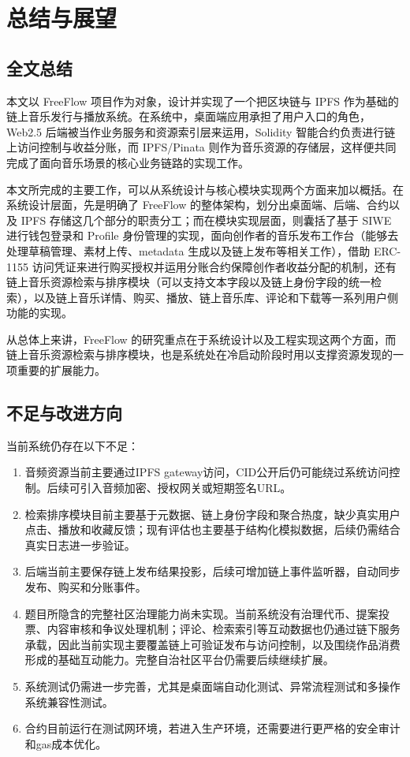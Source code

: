 
\chapter{总结与展望}


\section{全文总结}

本文以 FreeFlow 项目作为对象，设计并实现了一个把区块链与 IPFS 作为基础的链上音乐发行与播放系统。在系统中，桌面端应用承担了用户入口的角色，Web2.5 后端被当作业务服务和资源索引层来运用，Solidity 智能合约负责进行链上访问控制与收益分账，而 IPFS/Pinata 则作为音乐资源的存储层，这样便共同完成了面向音乐场景的核心业务链路的实现工作。

本文所完成的主要工作，可以从系统设计与核心模块实现两个方面来加以概括。在系统设计层面，先是明确了 FreeFlow 的整体架构，划分出桌面端、后端、合约以及 IPFS 存储这几个部分的职责分工；而在模块实现层面，则囊括了基于 SIWE 进行钱包登录和 Profile 身份管理的实现，面向创作者的音乐发布工作台（能够去处理草稿管理、素材上传、metadata 生成以及链上发布等相关工作），借助 ERC-1155 访问凭证来进行购买授权并运用分账合约保障创作者收益分配的机制，还有链上音乐资源检索与排序模块（可以支持文本字段以及链上身份字段的统一检索），以及链上音乐详情、购买、播放、链上音乐库、评论和下载等一系列用户侧功能的实现。

从总体上来讲，FreeFlow 的研究重点在于系统设计以及工程实现这两个方面，而链上音乐资源检索与排序模块，也是系统处在冷启动阶段时用以支撑资源发现的一项重要的扩展能力。


\section{不足与改进方向}

当前系统仍存在以下不足：

\begin{enumerate}
    \item 音频资源当前主要通过IPFS gateway访问，CID公开后仍可能绕过系统访问控制。后续可引入音频加密、授权网关或短期签名URL。
    \item 检索排序模块目前主要基于元数据、链上身份字段和聚合热度，缺少真实用户点击、播放和收藏反馈；现有评估也主要基于结构化模拟数据，后续仍需结合真实日志进一步验证。
    \item 后端当前主要保存链上发布结果投影，后续可增加链上事件监听器，自动同步发布、购买和分账事件。
    \item 题目所隐含的完整社区治理能力尚未实现。当前系统没有治理代币、提案投票、内容审核和争议处理机制；评论、检索索引等互动数据也仍通过链下服务承载，因此当前实现主要覆盖链上可验证发布与访问控制，以及围绕作品消费形成的基础互动能力。完整自治社区平台仍需要后续继续扩展。
    \item 系统测试仍需进一步完善，尤其是桌面端自动化测试、异常流程测试和多操作系统兼容性测试。
    \item 合约目前运行在测试网环境，若进入生产环境，还需要进行更严格的安全审计和gas成本优化。
\end{enumerate}


